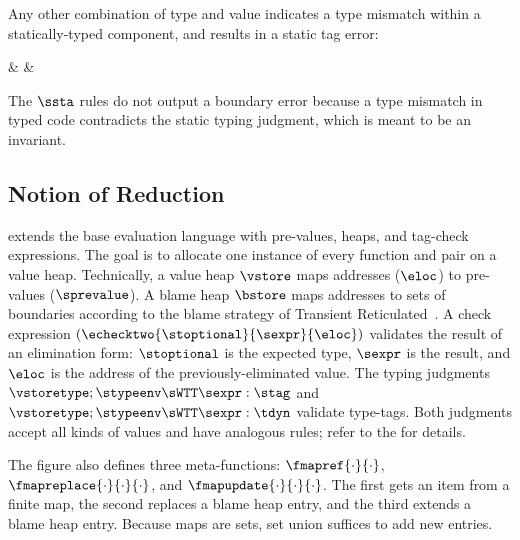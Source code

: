 \noindent
Any other combination of type and value indicates a type mismatch within a
 statically-typed component, and results in a static tag error:

\begin{inlinerrarray}
      &  \nredND
      &  \tagerrorS
      \\
\end{inlinerrarray}

\noindent
The $\ssta$ rules do not output a boundary error because a type mismatch in
typed code contradicts the static typing judgment, which is meant to be an
invariant.


\subsection{\Tname{} Notion of Reduction} \label{sub:first}

 extends the base evaluation language with
 pre-values, heaps, and tag-check expressions.
The goal is to allocate one
 instance of every function and pair on a value heap.
Technically, a value heap $\vstore$ maps addresses ($\eloc$) to pre-values ($\sprevalue$).
A blame heap $\bstore$ maps addresses to sets of boundaries according to the
 blame strategy of Transient Reticulated~\cite{vss-popl-2017,v-thesis-2019}.
A check expression
 $(\echecktwo{\stoptional}{\sexpr}{\eloc})$ validates the result of an
 elimination form: $\stoptional$ is the expected type, $\sexpr$ is the
 result, and $\eloc$ is the address of the previously-eliminated value.
The typing judgments {$\vstoretype; \stypeenv \sWTT \sexpr : \stag$} and
 {$\vstoretype; \stypeenv \sWTT \sexpr : \tdyn$} validate type-tags.
Both judgments accept all kinds of values and have analogous rules;
 refer to the \techreport{} for details.

The figure also defines three meta-functions: $\fmapref{\cdot}{\cdot}$,
$\fmapreplace{\cdot}{\cdot}{\cdot}$, and $\fmapupdate{\cdot}{\cdot}{\cdot}$.
The first gets an item from a finite map,
 the second replaces a blame heap entry,
 and the third extends a blame heap entry.
Because maps are sets, set union suffices to add new entries.

